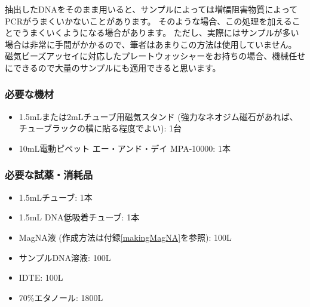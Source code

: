 \documentclass[titlepage,10pt,a4paper]{jsbook}
\begin{document}
抽出したDNAをそのまま用いると、サンプルによっては増幅阻害物質によってPCRがうまくいかないことがあります。
そのような場合、この処理を加えることでうまくいくようになる場合があります。
ただし、実際にはサンプルが多い場合は非常に手間がかかるので、筆者はあまりこの方法は使用していません。
磁気ビーズアッセイに対応したプレートウォッシャーをお持ちの場合、機械任せにできるので大量のサンプルにも適用できると思います。

\subsubsection{必要な機材}
\begin{itemize}
\item 1.5mLまたは2mLチューブ用磁気スタンド (強力なネオジム磁石があれば、チューブラックの横に貼る程度でよい): 1台
\item 10mL電動ピペット エー・アンド・デイ MPA-10000: 1本
\end{itemize}

\subsubsection{必要な試薬・消耗品}
\begin{itemize}
\item 1.5mLチューブ: 1本
\item 1.5mL DNA低吸着チューブ: 1本
\item MagNA液 (作成方法は付録\ref{makingMagNA}を参照): 100{\textmu}L
\item サンプルDNA溶液: 100{\textmu}L
\item IDTE: 100{\textmu}L
\item 70\%エタノール: 1800{\textmu}L
\end{itemize}
\end{document}
